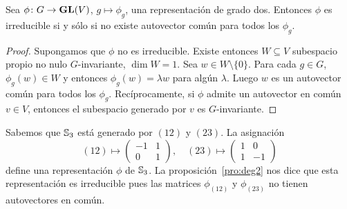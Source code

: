 
\begin{proposition}
  \label{pro:deg2}
  Sea $\phi\colon G\to \mathbf{GL}(V)$, $g\mapsto\phi_g$, una representación de grado dos. Entonces $\phi$ es
  irreducible si y sólo si no existe autovector común para todos los $\phi_g$.
\end{proposition}

\begin{proof}
  Supongamos que $\phi$ no es irreducible. Existe entonces $W\subseteq V$ 
  subespacio propio no nulo $G$-invariante, $\dim W=1$. Sea $w\in W\setminus\{0\}$.
  Para cada $g\in G$, $\phi_g(w)\in W$ y entonces $\phi_g(w)=\lambda w$ para
  algún $\lambda$. Luego $w$ es un autovector común para todos los $\phi_g$.
  Recíprocamente, si $\phi$ admite un autovector en común $v\in V$, entonces el
  subespacio generado por $v$ es $G$-invariante.
\end{proof}

\begin{example}
  \label{exa:S3deg2}
  Sabemos que $\mathbb{S}_3$ está generado por $(12)$ y $(23)$. La asignación
  \[(12)\mapsto\begin{pmatrix}
    -1 & 1\\
    0 & 1
  \end{pmatrix},
  \quad
  (23)\mapsto\begin{pmatrix}
    1 & 0\\
    1 & -1
  \end{pmatrix}
  \]
  define una representación $\phi$ de $\mathbb{S}_3$. 
  La proposición~\ref{pro:deg2} nos dice que esta representación 
  es irreducible pues las matrices $\phi_{(12)}$ y $\phi_{(23)}$
  no tienen autovectores en común.

\end{example}

